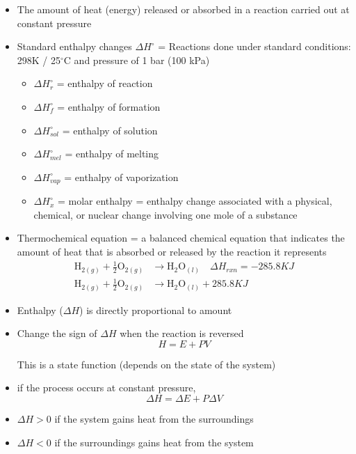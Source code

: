 \documentclass[11pt]{article}
\begin{document}
\begin{itemize}
    \pagebreak
    \item The amount of heat (energy) released or absorbed in a reaction carried out at constant pressure
    \item Standard enthalpy changes $\Delta H^\circ$ = Reactions done under standard conditions: 298K / 25$^\circ$C and pressure of 1 bar (100 kPa)
    \begin{itemize}
        \item $\Delta H^\circ_{r}$ = enthalpy of reaction
        \item $\Delta H^\circ_{f}$ = enthalpy of formation
        \item $\Delta H^\circ_{sol}$ = enthalpy of solution
        \item $\Delta H^\circ_{mel}$ = enthalpy of melting
        \item $\Delta H^\circ_{vap}$ = enthalpy of vaporization 
        \item $\Delta H^\circ_{x}$ = molar enthalpy = enthalpy change associated with a physical, chemical, or nuclear change involving one mole of a substance
    \end{itemize}
    \item Thermochemical equation = a balanced chemical equation that indicates the amount of heat that is absorbed or released by the reaction it represents
    \begin{align}
        \text{H}_{2(g)} + \frac{1}{2}\text{O}_{2(g)} &\xrightarrow{} \text{H}_2\text{O}_{(l)} \quad \Delta H_{rxn} = -285.8KJ \\
        \text{H}_{2(g)} + \frac{1}{2}\text{O}_{2(g)} &\xrightarrow{} \text{H}_2\text{O}_{(l)} + 285.8KJ
    \end{align}
    \item Enthalpy ($\Delta H$) is directly proportional to amount
    \item Change the sign of $\Delta H$ when the reaction is reversed
    \\

    \begin{equation}
        H=E+PV
    \end{equation}
    \begin{center}
        This is a state function (depends on the state of the system)
    \end{center}
    \item if the process occurs at constant pressure,
    \begin{equation}
        \Delta H = \Delta E + P\Delta V
    \end{equation}
    \item $\Delta H > 0$ if the system gains heat from the surroundings
    \item $\Delta H < 0$ if the surroundings gains heat from the system
    \\


\end{itemize}
\end{document}
